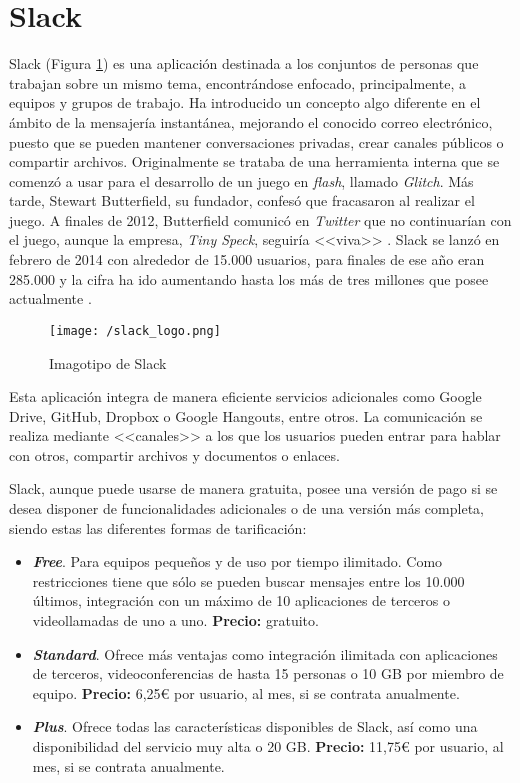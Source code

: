 \section{Slack}
\label{sec:slack}

Slack (Figura \ref{fig:slack}) es una aplicación destinada a los conjuntos de personas que trabajan sobre un mismo tema, encontrándose enfocado, principalmente, a equipos y grupos de trabajo. Ha introducido un concepto algo diferente en el ámbito de la mensajería instantánea, mejorando el conocido correo electrónico, puesto que se pueden mantener conversaciones privadas, crear canales públicos o compartir archivos. Originalmente se trataba de una herramienta interna que se comenzó a usar para el desarrollo de un juego en \textit{flash}, llamado \textit{Glitch}. Más tarde, Stewart Butterfield, su fundador, confesó que fracasaron al realizar el juego. A finales de 2012, Butterfield comunicó en \textit{Twitter} que no continuarían con el juego, aunque la empresa, \textit{Tiny Speck}, seguiría <<viva>> \cite{Thomas2015}. Slack se lanzó en febrero de 2014 con alrededor de 15.000 usuarios, para finales de ese año eran 285.000 y la cifra ha ido aumentando hasta los más de tres millones que posee actualmente \cite{PyMEs2017}.

\begin{figure}[!h]
	\begin{center}
		\texttt{[image: /slack\_logo.png]}
		\caption{Imagotipo de Slack}
		\label{fig:slack}
	\end{center}
\end{figure}

Esta aplicación integra de manera eficiente servicios adicionales como Google Drive, GitHub, Dropbox o Google Hangouts, entre otros. La comunicación se realiza mediante <<canales>> a los que los usuarios pueden entrar para hablar con otros, compartir archivos y documentos o enlaces.

\clearpage

Slack, aunque puede usarse de manera gratuita, posee una versión de pago si se desea disponer de funcionalidades adicionales o de una versión más completa, siendo estas las diferentes formas de tarificación:

\begin{itemize}
	\item \textbf{\textit{Free}}. Para equipos pequeños y de uso por tiempo ilimitado. Como restricciones tiene que sólo se pueden buscar mensajes entre los 10.000 últimos, integración con un máximo de 10 aplicaciones de terceros o videollamadas de uno a uno. \textbf{Precio:} gratuito.
	\item \textbf{\textit{Standard}}. Ofrece más ventajas como integración ilimitada con aplicaciones de terceros, videoconferencias de hasta 15 personas o 10 \acs{GB} por miembro de equipo. \textbf{Precio:} 6,25\euro{} por usuario, al mes, si se contrata anualmente.
	\item \textbf{\textit{Plus}}. Ofrece todas las características disponibles de Slack, así como una disponibilidad del servicio muy alta o 20 \acs{GB}. \textbf{Precio:} 11,75\euro{} por usuario, al mes, si se contrata anualmente.
\end{itemize}

